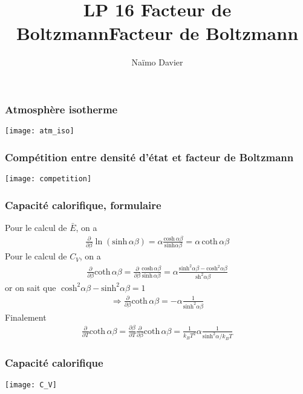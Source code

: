 \documentclass{beamer}
\title{LP 16 Facteur de Boltzmann}
\author{Naïmo Davier}
\institute{Université Paul sabatier}
\begin{document}
	
\begin{frame}
	\titlepage
\end{frame}

\addtocounter{framenumber}{-1}
\title{Facteur de Boltzmann}

\begin{frame}
\frametitle{Atmosphère isotherme}
\centerline{\texttt{[image: atm\_iso]}}
\end{frame}

\begin{frame}
\frametitle{Compétition entre densité d'état et facteur de Boltzmann}
\centerline{\texttt{[image: competition]}}
\end{frame}

\begin{frame}
\frametitle{Capacité calorifique, formulaire}
Pour le calcul de $\bar{E}$, on a
\begin{eqnarray}
\frac{\partial }{\partial \beta}\ln(\mathrm{sinh}\, \alpha \beta) = \alpha \frac{\mathrm{cosh}\, \alpha \beta}{\mathrm{sinh}\alpha \beta} = \alpha\, \mathrm{coth}\, \alpha \beta
\end{eqnarray}
Pour le calcul de $C_V$, on a
\begin{eqnarray}
\frac{\partial }{\partial \beta} \mathrm{coth}\, \alpha \beta = \frac{\partial }{\partial \beta} \frac{\mathrm{cosh}\, \alpha \beta}{\mathrm{sinh}\, \alpha \beta} =  \alpha \frac{\mathrm{sinh}^2\alpha \beta - \mathrm{cosh}^2\alpha \beta}{\mathrm{sh}^2\alpha \beta}
\end{eqnarray}
or on sait que $\;\mathrm{cosh}^2\alpha \beta - \mathrm{sinh}^2\alpha \beta =1$
\begin{eqnarray}
\Longrightarrow \frac{\partial }{\partial \beta} \mathrm{coth}\, \alpha \beta = -\alpha \frac{1}{\mathrm{sinh}^2\alpha \beta}
\end{eqnarray}
Finalement 
\begin{eqnarray}
\frac{\partial }{\partial T} \mathrm{coth}\, \alpha \beta =   \frac{\partial \beta}{\partial T} \frac{\partial }{\partial \beta} \mathrm{coth}\, \alpha \beta = \frac{1}{k_BT^2} \alpha \frac{1}{\mathrm{sinh}^2\alpha /k_BT}
\end{eqnarray}
\end{frame}

\begin{frame}
\frametitle{Capacité calorifique}
\centerline{\texttt{[image: C\_V]}}
\end{frame}
\end{document}
